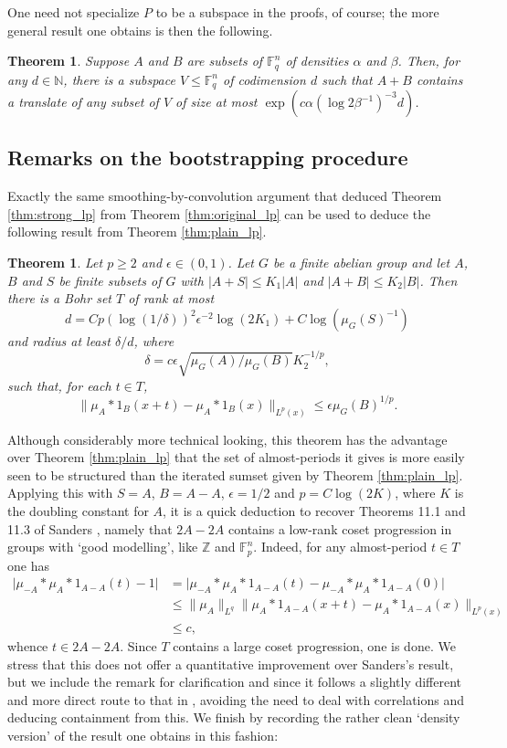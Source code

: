 \documentclass[12pt,a4paper,reqno]{amsart}
\numberwithin{equation}{section}
\theoremstyle{plain}
\newtheorem{theorem}[subsection]{Theorem}
\theoremstyle{definition}
\renewcommand{\leq}{\leqslant}
\renewcommand{\geq}{\geqslant}
\def\Z{\mathbb{Z}}
\def\N{\mathbb{N}}
\def\F{\mathbb{F}}
\providecommand{\abs}[1]{\lvert#1\rvert}
\providecommand{\norm}[1]{\lVert #1 \rVert}
\theoremstyle{plain}
\begin{document}
One need not specialize $P$ to be a subspace in the proofs, of course; the more general result one obtains is then the following.

\begin{theorem}
Suppose $A$ and $B$ are subsets of $\F_q^n$ of densities $\alpha$ and $\beta$. Then, for any $d \in \N$, there is a subspace $V \leq \F_q^n$ of codimension $d$ such that $A+B$ contains a translate of any subset of $V$ of size at most $\exp\left( c \alpha (\log 2\beta^{-1})^{-3} d \right)$.
\end{theorem}


\subsection*{Remarks on the bootstrapping procedure}

Exactly the same smoothing-by-convolution argument that deduced Theorem \ref{thm:strong_lp} from Theorem \ref{thm:original_lp} can be used to deduce the following result from Theorem \ref{thm:plain_lp}.

\begin{theorem}\label{thm:plain_lp_bohr}
Let $p \geq 2$ and $\epsilon \in (0,1)$. Let $G$ be a finite abelian group and let $A$, $B$ and $S$ be finite subsets of $G$ with $\abs{A+S} \leq K_1\abs{A}$ and $\abs{A+B} \leq K_2 \abs{B}$. Then there is a Bohr set $T$ of rank at most 
$$d=Cp(\log(1/\delta))^2\epsilon^{-2}\log (2K_1) + C\log(\mu_G(S)^{-1})$$
and radius at least $\delta/d$, where
$$\delta=c\epsilon\sqrt{\mu_G(A)/\mu_G(B)}K_2^{-1/p},$$
such that, for each $t \in T$,
\[ \norm{ \mu_A*1_B(x+t) - \mu_A*1_B(x) }_{L^p(x)} \leq \epsilon \mu_G(B)^{1/p}. \]
\end{theorem}

Although considerably more technical looking, this theorem has the advantage over Theorem \ref{thm:plain_lp} that the set of almost-periods it gives is more easily seen to be structured than the iterated sumset given by Theorem \ref{thm:plain_lp}. 
Applying this with $S=A$, $B=A-A$, $\epsilon = 1/2$ and $p=C\log(2K)$, where $K$ is the doubling constant for $A$, it is a quick deduction to recover Theorems 11.1 and 11.3 of Sanders \cite{sanders:bogolyubov}, namely that $2A-2A$ contains a low-rank coset progression in groups with `good modelling', like $\Z$ and $\F_p^n$. Indeed, for any almost-period $t \in T$ one has
\begin{align*}
\abs{\mu_{-A}*\mu_A*1_{A-A}(t) - 1} &= \abs{\mu_{-A}*\mu_A*1_{A-A}(t) - \mu_{-A}*\mu_A*1_{A-A}(0)} \\
&\leq \norm{\mu_A}_{L^q} \norm{\mu_A*1_{A-A}(x+t) - \mu_A*1_{A-A}(x)}_{L^p(x)} \\
&\leq c,
\end{align*}
whence $t \in 2A-2A$. Since $T$ contains a large coset progression, one is done.  We stress that this does not offer a quantitative improvement over Sanders's result, but we include the remark for clarification and since it follows a slightly different and more direct route to that in \cite{sanders:bogolyubov}, avoiding the need to deal with correlations and deducing containment from this.
We finish by recording the rather clean `density version' of the result one obtains in this fashion:
\end{document}
